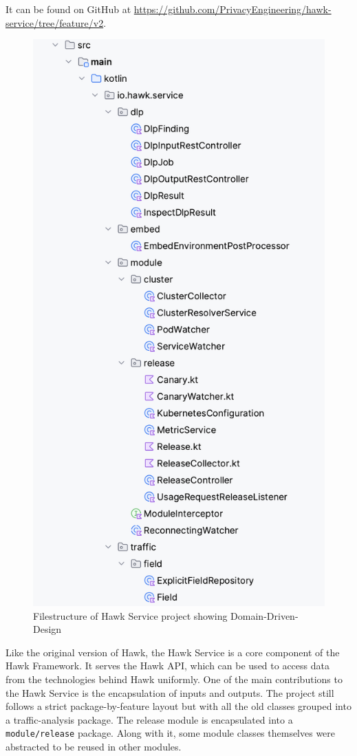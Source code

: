 It can be found on GitHub at \url{https://github.com/PrivacyEngineering/hawk-service/tree/feature/v2}.

\begin{figure}[!htb]
  \centering

  \includegraphics[width=0.8\columnwidth]{hawk-service-file.png}

  \caption[Hawk Service file structure]{Filestructure of Hawk Service project showing Domain-Driven-Design}  
  \label{fig:hawk-dlp-uml}
\end{figure}
Like the original version of Hawk, the Hawk Service is a core component of the Hawk Framework. It serves the Hawk API, which can be used to access data from the technologies behind Hawk uniformly. One of the main contributions to the Hawk Service is the encapsulation of inputs and outputs. The project still follows a strict package-by-feature layout but with all the old classes grouped into a traffic-analysis package. The release module is encapsulated into a \texttt{module/release} package. Along with it, some module classes themselves were abstracted to be reused in other modules.

